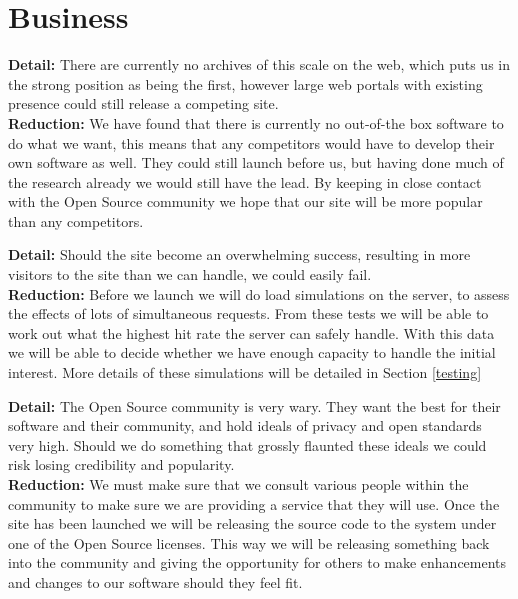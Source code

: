 \pagebreak
\section{Business}

\textbf{Detail:} There are currently no archives of this scale on the web, which puts us in the strong position as being the first, however large web portals with existing presence could still release a competing site.
\\
\textbf{Reduction:} We have found that there is currently no out-of-the box software to do what we want, this means that any competitors would have to develop their own software as well.  They could still launch before us, but having done much of the research already we would still have the lead.  By keeping in close contact with the Open Source community we hope that our site will be more popular than any competitors.
\vspace{3mm}

\textbf{Detail:} Should the site become an overwhelming success, resulting in more visitors to the site than we can handle, we could easily fail.
\\
\textbf{Reduction:} Before we launch we will do load simulations on the server, to assess the effects of lots of simultaneous requests.  From these tests we will be able to work out what the highest hit rate the server can safely handle.  With this data we will be able to decide whether we have enough capacity to handle the initial interest.  More details of these simulations will be detailed in Section \ref{testing}
\vspace{3mm}

\textbf{Detail:} The Open Source community is very wary.  They want the best for their software and their community, and hold ideals of privacy and open standards very high.  Should we do something that grossly flaunted these ideals we could risk losing credibility and popularity.
\\
\textbf{Reduction:} We must make sure that we consult various people within the community to make sure we are providing a service that they will use.  Once the site has been launched we will be releasing the source code to the system under one of the Open Source licenses.  This way we will be releasing something back into the community and giving the opportunity for others to make enhancements and changes to our software should they feel fit.
